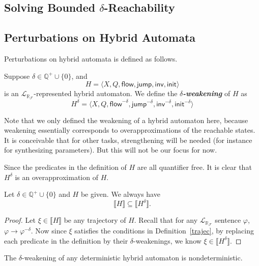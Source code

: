 \documentclass[envcountsect]{llncs}
\newcommand{\flow}{\mathsf{flow}}
\newcommand{\jump}{\mathsf{jump}}
\newcommand{\inv}{\mathsf{inv}}
\newcommand{\init}{\mathsf{init}}
\newcommand{\lrf}{\mathcal{L}_{\mathbb{R}_{\mathcal{F}}}}
\begin{document}
\subsection{Solving Bounded $\delta$-Reachability}


\subsection{Perturbations on Hybrid Automata}
Perturbations on hybrid automata is defined as follows. 

\begin{definition}
Suppose $\delta\in\mathbb{Q}^+\cup\{0\}$, and 
$$H = \langle X, Q, \flow, \jump, \inv, \init\rangle$$
is an $\lrf$-represented hybrid automaton. We define the {\bf \em $\delta$-weakening} of $H$ as
$$H^{\delta} = \langle X, Q, \flow^{-\delta}, \jump^{-\delta}, \inv^{-\delta}, \init^{-\delta}\rangle$$
\end{definition}

\begin{remark}
Note that we only defined the weakening of a hybrid automaton here, because weakening essentially corresponds to overapproximations of the reachable states. It is conceivable that for other tasks, strengthening will be needed (for instance for synthesizing parameters). But this will not be our focus for now. 
\end{remark}

Since the predicates in the definition of $H$ are all quantifier free. It is clear that $H^{\delta}$ is an overapproximation of $H$. 
\begin{proposition} Let $\delta\in\mathbb{Q}^+\cup \{0\}$ and $H$ be given. We always have
$$\llbracket H\rrbracket\subseteq \llbracket H^{\delta}\rrbracket.$$
\end{proposition}
\begin{proof}
Let $\xi\in \llbracket H\rrbracket$ be any trajectory of $H$. Recall that for any $\lrf$ sentence $\varphi$, $\varphi\rightarrow\varphi^{-\delta}$. Now since $\xi$ satisfies the conditions in Definition~\ref{trajec}, by replacing each predicate in the definition by their $\delta$-weakenings, we know $\xi\in \llbracket H^{\delta}\rrbracket$.
\end{proof}
\begin{remark}
The $\delta$-weakening of any deterministic hybrid automaton is nondeterministic. 
\end{remark}
\end{document}
